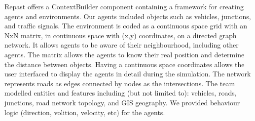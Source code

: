 \documentclass[11pt]{article}
\begin{document}
Repast offers a ContextBuilder component containing a framework for creating agents and environments. Our agents included objects such as vehicles, junctions, and traffic signals. The environment is coded as a continuous space grid with an NxN matrix, in continuous space with (x,y) coordinates, on a directed graph network. It allows agents to be aware of their neighbourhood, including other agents.
The matrix allows the agents to know their real position and determine the distance between objects. Having a continuous space coordinates allows the user interfaced to display the agents in detail during the simulation. The network represents roads as edges connected by nodes as the intersections.
The team modelled entities and features including (but not limited to): vehicles, roads, junctions, road network topology, and GIS geography. We provided behaviour logic (direction, volition, velocity, etc) for the agents.
\end{document}
